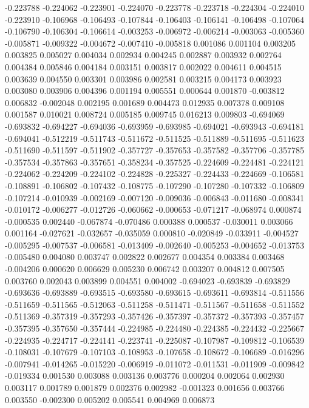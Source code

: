 -0.223788
-0.224062
-0.223901
-0.224070
-0.223778
-0.223718
-0.224304
-0.224010
-0.223910
-0.106968
-0.106493
-0.107844
-0.106403
-0.106141
-0.106498
-0.107064
-0.106790
-0.106304
-0.106614
-0.003253
-0.006972
-0.006214
-0.003063
-0.005360
-0.005871
-0.009322
-0.004672
-0.007410
-0.005818
0.001086
0.001104
0.003205
0.003825
0.005027
0.004034
0.002934
0.004245
0.002887
0.003932
0.002764
0.004384
0.005846
0.004184
0.003151
0.003817
0.002022
0.004611
0.004515
0.003639
0.004550
0.003301
0.003986
0.002581
0.003215
0.004173
0.003923
0.003080
0.003906
0.004396
0.001194
0.005551
0.000644
0.001870
-0.003812
0.006832
-0.002048
0.002195
0.001689
0.004473
0.012935
0.007378
0.009108
0.001587
0.010021
0.008724
0.005185
0.009745
0.016213
0.009803
-0.694069
-0.693832
-0.694227
-0.694036
-0.693959
-0.693985
-0.694021
-0.693943
-0.694181
-0.694041
-0.512219
-0.511743
-0.511672
-0.511525
-0.511889
-0.511695
-0.511623
-0.511690
-0.511597
-0.511902
-0.357727
-0.357653
-0.357582
-0.357706
-0.357785
-0.357534
-0.357863
-0.357651
-0.358234
-0.357525
-0.224609
-0.224481
-0.224121
-0.224062
-0.224209
-0.224102
-0.224828
-0.225327
-0.224433
-0.224669
-0.106581
-0.108891
-0.106802
-0.107432
-0.108775
-0.107290
-0.107280
-0.107332
-0.106809
-0.107214
-0.010939
-0.002169
-0.007120
-0.009036
-0.006843
-0.011680
-0.008341
-0.010172
-0.006277
-0.012726
-0.060662
-0.000653
-0.071217
-0.068974
0.000874
-0.000535
0.002440
-0.067874
-0.070486
0.000388
0.000537
-0.030011
0.003066
0.001164
-0.027621
-0.032657
-0.035059
0.000810
-0.020849
-0.033911
-0.004527
-0.005295
-0.007537
-0.006581
-0.013409
-0.002640
-0.005253
-0.004652
-0.013753
-0.005480
0.004080
0.003747
0.002822
0.002677
0.004354
0.003384
0.003468
-0.004206
0.000620
0.006629
0.005230
0.006742
0.003207
0.004812
0.007505
0.003760
0.002043
0.003899
0.004551
0.004002
-0.694023
-0.693839
-0.693829
-0.693636
-0.693889
-0.693515
-0.693580
-0.693615
-0.693611
-0.693814
-0.511556
-0.511659
-0.511565
-0.512063
-0.511258
-0.511471
-0.511567
-0.511658
-0.511552
-0.511369
-0.357319
-0.357293
-0.357426
-0.357397
-0.357372
-0.357393
-0.357457
-0.357395
-0.357650
-0.357444
-0.224985
-0.224480
-0.224385
-0.224432
-0.225667
-0.224935
-0.224717
-0.224141
-0.223741
-0.225087
-0.107987
-0.109812
-0.106539
-0.108031
-0.107679
-0.107103
-0.108953
-0.107658
-0.108672
-0.106689
-0.016296
-0.007941
-0.014265
-0.015220
-0.006919
-0.011072
-0.011531
-0.011909
-0.009842
-0.019334
0.001530
0.003088
0.003136
0.003776
0.000204
0.002064
0.002930
0.003117
0.001789
0.001879
0.002376
0.002982
-0.001323
0.001656
0.003766
0.003550
-0.002300
0.005202
0.005541
0.004969
0.006873
